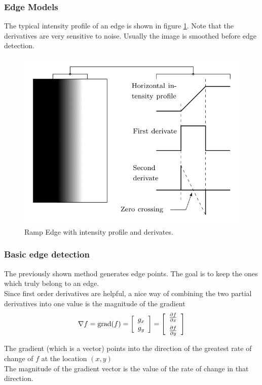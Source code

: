 \subsubsection{Edge Models}

The typical intensity profile of an edge is shown in figure \ref{fig:imseg_edgemodels}.
Note that the derivatives are very sensitive to noise. Usually the image is smoothed before
edge detection.

\begin{figure}[!h]
	\centering
	\includegraphics[width=.5\linewidth]{figures/tikz/segmentation/EdgeModelsRamp.png}
	\caption{Ramp Edge with intensity profile and derivates.}
	\label{fig:imseg_edgemodels}
\end{figure}

\subsubsection{Basic edge detection}
The previously shown method generates edge points. The goal is to keep the ones which truly belong to an edge.\\
Since first order derivatives are helpful, a nice way of combining the two partial derivatives into one value is the magnitude of the gradient
\begin{equation}
	\nabla f = \text{grad}(f) = \left[\begin{array}{c} g_x \\ g_y \end{array}\right] =  \left[\displaystyle{\begin{array}{c} \frac{\partial f}{\partial x} \vspace{0.2cm}  \\ \frac{\partial f}{\partial y} \end{array}}\right] \notag
\end{equation}

The gradient (which is a vector) points into the direction of the greatest rate of change of $f$ at the location $(x,y)$\\
The magnitude of the gradient vector is the value of the rate of change in that direction. \\

